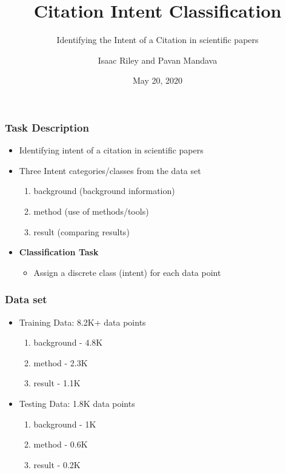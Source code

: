 \documentclass[
  xcolor={svgnames},
  hyperref={colorlinks,citecolor=DeepPink4,linkcolor=DarkRed,urlcolor=DarkBlue}
  ]{beamer}
\title[] %
{Citation Intent Classification}
\subtitle{Identifying the Intent of a Citation in scientific papers}
\author[tmip, hieutt] %
{Isaac Riley and Pavan Mandava}
\institute[Universities Here and There] %
{
  \inst{1}%
  Computational Linguistics, M.Sc.\\
  \and
  \inst{2}%
  Computational Linguistics, M.Sc.\\
}
\date[] %
{May 20, 2020}
\begin{document}
\begin{frame}
\titlepage
\end{frame}


\begin{frame}
\frametitle{Task Description}

\begin{itemize}

\item Identifying intent of a citation in scientific papers
\bigskip
\item Three Intent categories/classes from the data set
	\begin{enumerate}
		\item background (background information)
		\item method (use of methods/tools)
		\item result (comparing results)
	\end{enumerate}
\bigskip
\item {\bf Classification Task }
	\begin{itemize}
		\item Assign a discrete class (intent) for each data point
	\end{itemize}
\end{itemize}

\end{frame}

\begin{frame}
\frametitle{Data set}

\begin{itemize}

\item Training Data: 8.2K+ data points
	\begin{enumerate}
		\item background - 4.8K
		\item method - 2.3K
		\item result - 1.1K
	\end{enumerate}
\bigskip
\item Testing Data: 1.8K data points
	\begin{enumerate}
		\item background - 1K
		\item method - 0.6K
		\item result - 0.2K
	\end{enumerate}
\end{itemize}

\end{frame}
\end{document}
